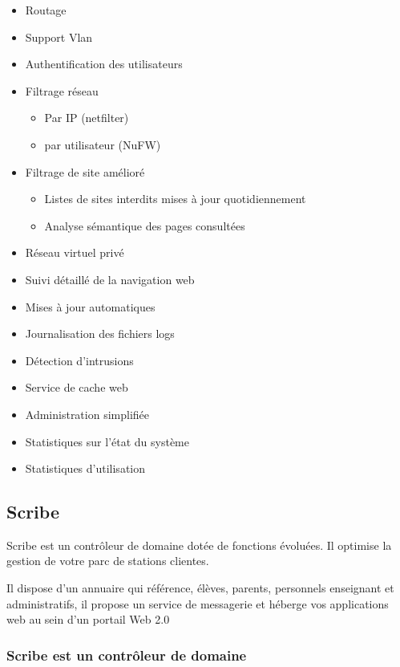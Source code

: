 \begin{itemize}
  \item Routage
  \item Support Vlan
  \item Authentification des utilisateurs
  \item Filtrage réseau
    \begin{itemize}
      \item Par IP (netfilter)
      \item par utilisateur (NuFW)
    \end{itemize}
  \item Filtrage de site amélioré
    \begin{itemize}
      \item Listes de sites interdits mises à jour quotidiennement
      \item Analyse sémantique des pages consultées
    \end{itemize}
  \item Réseau virtuel privé
  \item Suivi détaillé de la navigation web
  \item Mises à jour automatiques
  \item Journalisation des fichiers logs
  \item Détection d'intrusions
  \item Service de cache web
  \item Administration simplifiée
  \item Statistiques sur l'état du système
  \item Statistiques d'utilisation
\end{itemize}   

\subsection{Scribe}

Scribe est un contrôleur de domaine dotée de fonctions évoluées. 
Il optimise la gestion de votre parc de stations clientes.

Il dispose d'un annuaire qui référence, élèves, parents, personnels 
enseignant et administratifs, il propose un service de messagerie et héberge 
vos applications web au sein d'un portail Web 2.0

\subsubsection{Scribe est un contrôleur de domaine}

